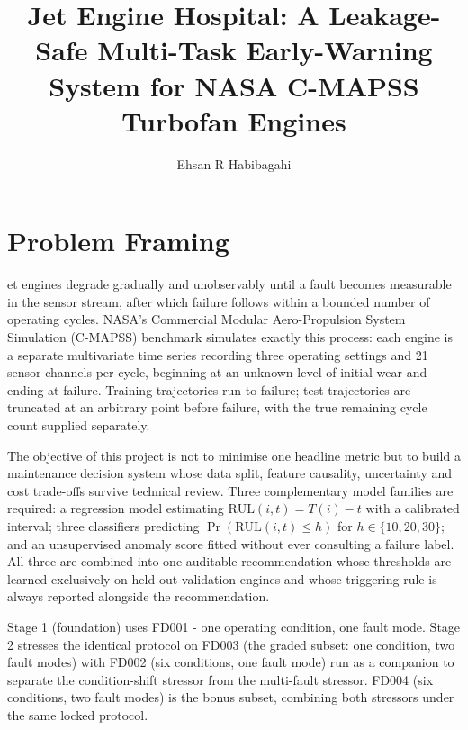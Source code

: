 \documentclass[9pt,a4paper,twocolumn,twoside]{rho-class/rho}
\title{Jet Engine Hospital: A Leakage-Safe Multi-Task Early-Warning System for NASA C-MAPSS Turbofan Engines}
\author[{\textasteriskcentered},a,1]{Ehsan R Habibagahi}
\affil[a]{Department of Computer Science, Shahid Beheshti University}
\begin{document}
    \maketitle
    \thispagestyle{firststyle}


\section{Problem Framing}

    et engines degrade gradually and unobservably until a fault becomes measurable in the sensor stream, after which failure follows within a bounded number of operating cycles. NASA's Commercial Modular Aero-Propulsion System Simulation (C-MAPSS) benchmark \cite{saxena2008damage,saxena2008cmapss,frederick2007cmapss} simulates exactly this process: each engine is a separate multivariate time series recording three operating settings and 21 sensor channels per cycle, beginning at an unknown level of initial wear and ending at failure. Training trajectories run to failure; test trajectories are truncated at an arbitrary point before failure, with the true remaining cycle count supplied separately.

    The objective of this project is not to minimise one headline metric but to build a maintenance decision system whose data split, feature causality, uncertainty and cost trade-offs survive technical review. Three complementary model families are required: a regression model estimating $\mathrm{RUL}(i,t) = T(i) - t$ with a calibrated interval; three classifiers predicting $\Pr(\mathrm{RUL}(i,t) \le h)$ for $h \in \{10,20,30\}$; and an unsupervised anomaly score fitted without ever consulting a failure label. All three are combined into one auditable recommendation whose thresholds are learned exclusively on held-out validation engines and whose triggering rule is always reported alongside the recommendation.

    \begin{rhoenv}[frametitle=Two-stage design]
        Stage 1 (foundation) uses FD001 - one operating condition, one fault mode. Stage 2 stresses the identical protocol on FD003 (the graded subset: one condition, two fault modes) with FD002 (six conditions, one fault mode) run as a companion to separate the condition-shift stressor from the multi-fault stressor. FD004 (six conditions, two fault modes) is the bonus subset, combining both stressors under the same locked protocol.
    \end{rhoenv}
\end{document}
